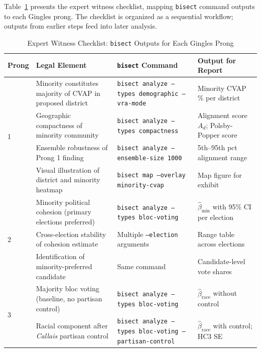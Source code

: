 \label{sec:checklist}

Table~\ref{tab:checklist} presents the expert witness checklist, mapping
\texttt{bisect} command outputs to each Gingles prong.  The checklist is
organized as a sequential workflow; outputs from earlier steps feed into
later analysis.

\begin{table}[h]
\centering
\caption{Expert Witness Checklist: \texttt{bisect} Outputs for Each Gingles Prong}
\label{tab:checklist}
\begin{threeparttable}
\begin{tabular}{p{1cm}p{3.5cm}p{4cm}p{3.5cm}}
\toprule
Prong & Legal Element & \texttt{bisect} Command & Output for Report \\
\midrule
\multirow{4}{*}{1} &
  Minority constitutes majority of CVAP in proposed district &
  \texttt{bisect analyze --types demographic --vra-mode} &
  Minority CVAP \% per district \\
\cmidrule{2-4}
  & Geographic compactness of minority community &
  \texttt{bisect analyze --types compactness} &
  Alignment score $A_d$; Polsby-Popper score \\
\cmidrule{2-4}
  & Ensemble robustness of Prong 1 finding &
  \texttt{bisect analyze --ensemble-size 1000} &
  5th--95th pct alignment range \\
\cmidrule{2-4}
  & Visual illustration of district and minority heatmap &
  \texttt{bisect map --overlay minority-cvap} &
  Map figure for exhibit \\
\midrule
\multirow{3}{*}{2} &
  Minority political cohesion (primary elections preferred) &
  \texttt{bisect analyze --types bloc-voting} &
  $\hat{\beta}_{\text{min}}$ with 95\% CI per election \\
\cmidrule{2-4}
  & Cross-election stability of cohesion estimate &
  Multiple \texttt{--election} arguments &
  Range table across elections \\
\cmidrule{2-4}
  & Identification of minority-preferred candidate &
  Same command &
  Candidate-level vote shares \\
\midrule
\multirow{4}{*}{3} &
  Majority bloc voting (baseline, no partisan control) &
  \texttt{bisect analyze --types bloc-voting} &
  $\hat{\beta}_{\text{race}}$ without control \\
\cmidrule{2-4}
  & Racial component after \textit{Callais} partisan control &
  \texttt{bisect analyze --types bloc-voting --partisan-control} &
  $\hat{\beta}_{\text{race}}$ with control; HC3 SE \\

\end{tabular}
\end{threeparttable}
\end{table}
